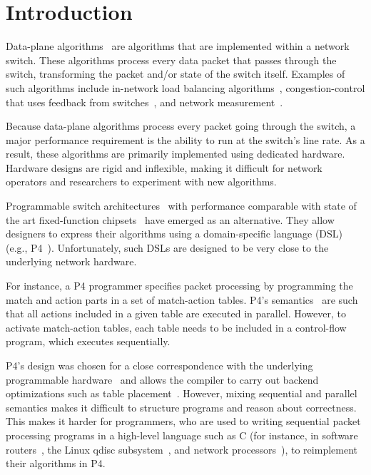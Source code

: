\section{Introduction}
\label{s:intro}

Data-plane algorithms~\cite{cestan} are algorithms that are implemented within
a network switch. These algorithms process every data packet that passes
through the switch, transforming the packet and/or state of the switch itself.
Examples of such algorithms include in-network load balancing
algorithms~\cite{conga, ecmp}, congestion-control that uses feedback from
switches~\cite{xcp, rcp, pdq, dctcp}, and network measurement~\cite{opensketch,
bitmap_george, elephant_george}.

Because data-plane algorithms process every packet going through the switch, a
major performance requirement is the ability to run at the switch's line rate.
As a result, these algorithms are primarily implemented using dedicated
hardware. Hardware designs are rigid and inflexible, making it difficult for
network operators and researchers to experiment with new algorithms.

Programmable switch architectures~\cite{flexpipe, xpliant, rmt} with
performance comparable with state of the art fixed-function
chipsets~\cite{trident, tomahawk, mellanox} have emerged as an alternative.
They allow designers to express their algorithms using a domain-specific
language (DSL) (e.g., P4~\cite{p4}).  Unfortunately, such DSLs are designed to
be very close to the underlying network hardware.

For instance, a P4 programmer specifies packet processing by programming the
match and action parts in a set of match-action tables. P4's
semantics~\cite{p4spec} are such that all actions included in a given table are
executed in parallel. However, to activate match-action tables, each table
needs to be included in a control-flow program, which executes sequentially.

P4's design was chosen for a close correspondence with the underlying
programmable hardware~\cite{flexpipe, rmt} and allows the compiler to carry out
backend optimizations such as table placement~\cite{lavanya_compiler}.
However, mixing sequential and parallel semantics makes it difficult to
structure programs and reason about correctness. This makes it harder for
programmers, who are used to writing sequential packet processing programs in a
high-level language such as C (for instance, in software routers~\cite{click,
intel_multicore}, the Linux qdisc subsystem~\cite{qdisc}, and network
processors~\cite{npu}), to reimplement their algorithms in P4.

